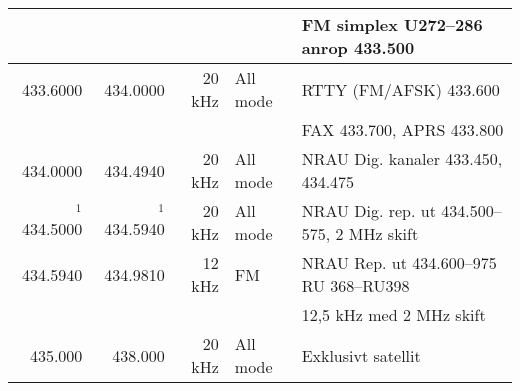 \begin{landscape}
\begin{tabular}{rrrll}
                                  &               &             &                 & FM simplex U272--286 \textbf{anrop 433.500}                  \\ \hline
	         433.6000         & 434.0000      & 20 kHz      & All mode        & RTTY (FM/AFSK) 433.600                                       \\
                                  &               &             &                 & FAX 433.700, APRS 433.800                                    \\ \hline
	         434.0000         & 434.4940      & 20 kHz      & All mode        & NRAU Dig. kanaler 433.450, 434.475                           \\ \hline
	    $^1$ 434.5000         & $^1$ 434.5940 & 20 kHz      & All mode        & NRAU Dig. rep. ut 434.500--575, 2 MHz skift                  \\ \hline
	         434.5940         & 434.9810      & 12 kHz      & FM              & NRAU Rep. ut 434.600--975 RU 368--RU398                      \\
                                  &               &             &                 & 12,5 kHz med 2 MHz skift                                     \\ \hline
	          435.000         & 438.000       & 20 kHz      & All mode        & Exklusivt satellit
\end{tabular}

\end{landscape}
